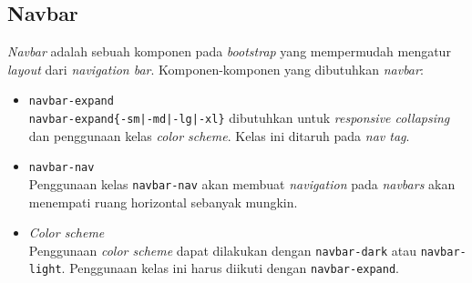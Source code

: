 \subsection{Navbar}

\textit{Navbar} adalah sebuah komponen pada \textit{bootstrap} yang mempermudah mengatur \textit{layout} dari \textit{navigation bar}. Komponen-komponen yang dibutuhkan \textit{navbar}:

\begin{itemize}
	\item \texttt{navbar-expand} \\
	\texttt{navbar-expand\{-sm|-md|-lg|-xl\}} dibutuhkan untuk \textit{responsive collapsing} dan penggunaan kelas \textit{color scheme}. Kelas ini ditaruh pada \textit{nav tag}.
	
	\item \texttt{navbar-nav} \\
	Penggunaan kelas \texttt{navbar-nav} akan membuat \textit{navigation} pada \textit{navbars} akan menempati ruang horizontal sebanyak mungkin. 
	
	\item \textit{Color scheme} \\
	Penggunaan \textit{color scheme} dapat dilakukan dengan \texttt{navbar-dark} atau \texttt{navbar-light}. Penggunaan kelas ini harus diikuti dengan \texttt{navbar-expand}.
	

\end{itemize}


